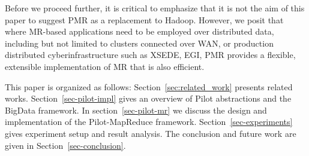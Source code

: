 \documentclass{acm_proc_article-sp}
\newcommand{\pnote}[1]{ {\textcolor{magenta} { ***pradeep: #1 }}}
\newcommand{\pnote}[1]{}
\newcommand{\upp}{\vspace*{-0.5em}}
\newcommand{\pilot}{Pilot\xspace}
\newcommand{\pilotmapreduce}{Pilot-MapReduce\xspace}
\begin{document}

Before we proceed further, it is critical to emphasize that it is not
the aim of this paper to suggest PMR as a replacement to Hadoop.
However, we posit that where MR-based applications need to be employed
over distributed data, including but not limited to clusters connected
over WAN, or production distributed cyberinfrastructure such as XSEDE,
EGI, PMR provides a flexible, extensible implementation of MR that is
also efficient.
 

This paper is organized as follows: Section~\ref{sec:related_work} presents
related works. Section~\ref{sec-pilot-impl} gives an overview of \pilot
abstractions and the BigData framework. In section~\ref{sec-pilot-mr} we discuss
the design and implementation of the \pilotmapreduce framework.
Section~\ref{sec-experiments} gives experiment setup and result analysis. The
conclusion and future work are given in Section~\ref{sec-conclusion}.

\upp\upp
\end{document}
